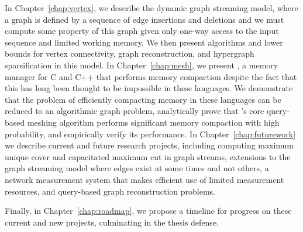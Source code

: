 In Chapter~\ref{chap:vertex}, we describe the dynamic graph streaming model, where a graph is defined by a sequence of edge insertions and deletions and we must compute some property of this graph given only one-way access to the input sequence and limited working memory.  We then present algorithms and lower bounds for vertex connectivity, graph reconstruction, and hypergraph sparsification in this model.  In Chapter~\ref{chap:mesh}, we present \Mesh, a memory manager for C and C++ that performs memory compaction despite the fact that this has long been thought to be impossible in these languages. We demonstrate that the problem of efficiently compacting memory in these languages can be reduced to an algorithmic graph problem, analytically prove that \Mesh's core query-based meshing algorithm performs significant memory compaction with high probability, and empirically verify its performance.  In Chapter~\ref{chap:futurework} we describe current and future research projects, including computing maximum unique cover and capacitated maximum cut in graph streams, extensions to the graph streaming model where edges exist at some times and not others, a network measurement system that makes efficient use of limited measurement resources, and query-based graph reconstruction problems.

Finally, in Chapter~\ref{chap:roadmap}, we propose a timeline for progress on these current and new projects, culminating in the thesis defense.